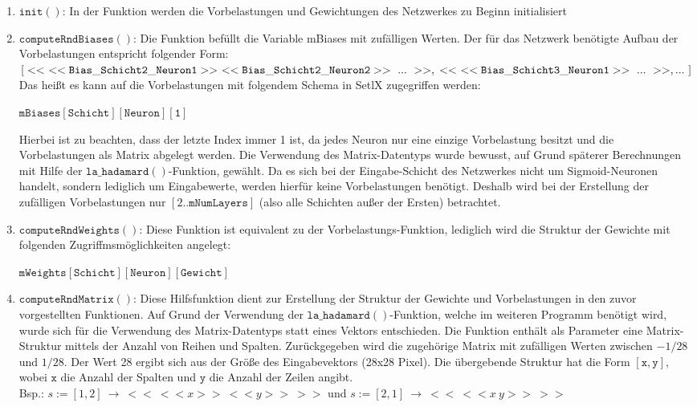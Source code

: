 \begin{enumerate}
\item $\mathtt{init()}$: In der Funktion werden die Vorbelastungen und Gewichtungen des Netzwerkes zu Beginn initialisiert
\item $\mathtt{computeRndBiases()}$: Die Funktion befüllt die Variable mBiases mit zufälligen Werten. Der für das Netzwerk benötigte Aufbau der Vorbelastungen entspricht folgender Form: \\
$[ \\ 
<<\ <<\mathtt{Bias\_Schicht2\_Neuron1}>>\ <<\mathtt{Bias\_Schicht2\_Neuron2}>>\ ...\ >>, \\
<<\ <<\mathtt{Bias\_Schicht3\_Neuron1}>>\ ...\ >>, \\
 ...\ ]$ \\
Das heißt es kann auf die Vorbelastungen mit folgendem Schema in SetlX zugegriffen werden: \\
\begin{center}
	$\mathtt{mBiases[Schicht][Neuron][1]}$
\end{center}
Hierbei ist zu beachten, dass der letzte Index immer 1 ist, da jedes Neuron nur eine einzige Vorbelastung besitzt und die Vorbelastungen als Matrix abgelegt werden. Die Verwendung des Matrix-Datentyps wurde bewusst, auf Grund späterer Berechnungen mit Hilfe der $\mathtt{la\_hadamard()}$-Funktion, gewählt. Da es sich bei der Eingabe-Schicht des Netzwerkes nicht um Sigmoid-Neuronen handelt, sondern lediglich um Eingabewerte, werden hierfür keine Vorbelastungen benötigt. Deshalb wird bei der Erstellung der zufälligen Vorbelastungen nur $[2..\mathtt{mNumLayers}]$ (also alle Schichten außer der Ersten) betrachtet.
\item $\mathtt{computeRndWeights()}$: Diese Funktion ist equivalent zu der Vorbelastungs-Funktion, lediglich wird die Struktur der Gewichte mit folgenden Zugriffmsmöglichkeiten angelegt: \\
\begin{center}
	$\mathtt{mWeights[Schicht][Neuron][Gewicht]}$
\end{center}
\item $\mathtt{computeRndMatrix()}$: Diese Hilfsfunktion dient zur Erstellung der Struktur der Gewichte und Vorbelastungen in den zuvor vorgestellten Funktionen. Auf Grund der Verwendung der $\mathtt{la\_hadamard()}$-Funktion, welche im weiteren Programm benötigt wird, wurde sich für die Verwendung des Matrix-Datentyps statt eines Vektors entschieden. Die Funktion enthält als Parameter eine Matrix-Struktur mittels der Anzahl von Reihen und Spalten. Zurückgegeben wird die zugehörige Matrix mit zufälligen Werten zwischen $-1/28$ und $1/28$. Der Wert 28 ergibt sich aus der Größe des Eingabevektors (28x28 Pixel).  Die übergebende Struktur hat die Form $\mathtt{[x,y]}$, wobei $\mathtt{x}$ die Anzahl der Spalten und $\mathtt{y}$ die Anzahl der Zeilen angibt. \\
Bsp.: $s := [1,2]\ \rightarrow\ <<\ <<x>>\ <<y>>\ >>$ und $s := [2,1]\ \rightarrow\ <<\ <<x\ y>>\ >>$
\end{enumerate}

